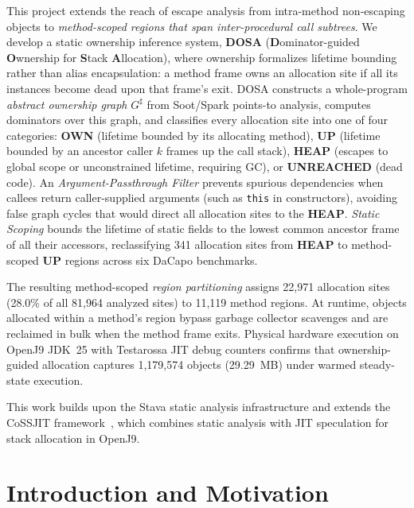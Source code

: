 \documentclass[12pt,a4paper]{article}
\newcommand{\OWN}{\textbf{OWN}}
\newcommand{\UP}{\textbf{UP}}
\newcommand{\HEAP}{\textbf{HEAP}}
\begin{document}
This project extends the reach of escape analysis from intra-method non-escaping objects to \emph{method-scoped regions that span inter-procedural call subtrees}. We develop a static ownership inference system, \textbf{DOSA} (\textbf{D}ominator-guided \textbf{O}wnership for \textbf{S}tack \textbf{A}llocation), where ownership formalizes lifetime bounding rather than alias encapsulation: a method frame owns an allocation site if all its instances become dead upon that frame's exit. DOSA constructs a whole-program \emph{abstract ownership graph} $G^\sharp$ from Soot/Spark points-to analysis, computes dominators over this graph, and classifies every allocation site into one of four categories: \OWN{} (lifetime bounded by its allocating method), \UP{} (lifetime bounded by an ancestor caller $k$ frames up the call stack), \HEAP{} (escapes to global scope or unconstrained lifetime, requiring GC), or \textbf{UNREACHED} (dead code). An \emph{Argument-Passthrough Filter} prevents spurious dependencies when callees return caller-supplied arguments (such as \texttt{this} in constructors), avoiding false graph cycles that would direct all allocation sites to the \HEAP{}. \emph{Static Scoping} bounds the lifetime of static fields to the lowest common ancestor frame of all their accessors, reclassifying 341 allocation sites from \HEAP{} to method-scoped \UP{} regions across six DaCapo benchmarks.

The resulting method-scoped \emph{region partitioning} assigns 22{,}971 allocation sites (28.0\% of all 81{,}964 analyzed sites) to 11{,}119 method regions. At runtime, objects allocated within a method's region bypass garbage collector scavenges and are reclaimed in bulk when the method frame exits. Physical hardware execution on OpenJ9 JDK~25 with Testarossa JIT debug counters confirms that ownership-guided allocation captures 1{,}179{,}574 objects (29.29~MB) under warmed steady-state execution.

This work builds upon the Stava static analysis infrastructure and extends the CoSSJIT framework~\cite{cossjit2025}, which combines static analysis with JIT speculation for stack allocation in OpenJ9.

\section{Introduction and Motivation}
\end{document}
